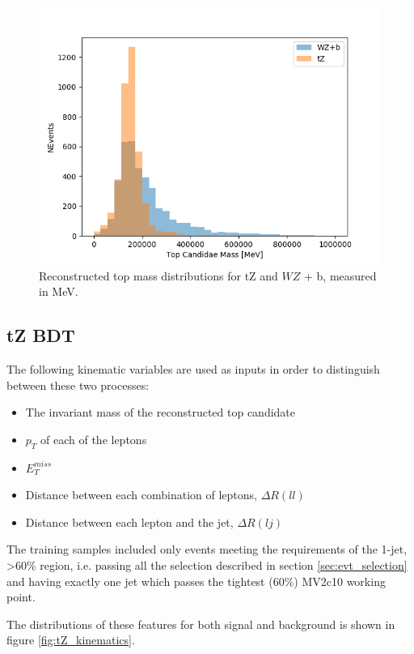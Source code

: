 \documentclass[NOTE, atlasdraft=true, texlive=2016, UKenglish]{\ATLASLATEXPATH atlasdoc}
\begin{document}
\begin{figure}
    \centering
    \includegraphics[width=0.7\linewidth]{tZ_bdt/topMass.png}
    \caption{Reconstructed top mass distributions for tZ and $WZ$ + b, measured in MeV.}
    \label{fig:topMass}
\end{figure}

\subsection{tZ BDT}
\label{subsec:tZ_bdt}
 
The following kinematic variables are used as inputs in order to distinguish between these two processes:
 
 \begin{itemize}
     \item The invariant mass of the reconstructed top candidate
     \item $p_T$ of each of the leptons
     \item $E_T^{miss}$
     \item Distance between each combination of leptons, $\Delta R (ll)$
     \item Distance between each lepton and the jet, $\Delta R (lj)$
 \end{itemize}
 
The training samples included only events meeting the requirements of the 1-jet, >60\% region, i.e. passing all the selection described in section \ref{sec:evt_selection} and having exactly one jet which passes the tightest (60\%) MV2c10 working point. 
 
The distributions of these features for both signal and background is shown in figure \ref{fig:tZ_kinematics}.
 
\end{document}
